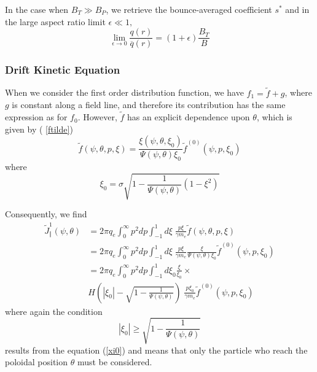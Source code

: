 In the case when $B_{T}\gg B_{P}$, we retrieve the bounce-averaged
coefficient $s^{*}$ and in the large aspect ratio limit $\epsilon\ll1,$%
\begin{equation}
\lim_{\epsilon\rightarrow0}\frac{q\left( r\right) }{\overline{q}\left(
r\right) }=\left( 1+\epsilon\right) \frac{B_{T}}{B}
\end{equation}

\subsubsection{Drift Kinetic Equation}

When we consider the first order distribution function, we have $f_{1}=%
\widetilde{f}+g$, where $g$ is constant along a field line, and therefore
its contribution has the same expression as for $f_{0}$. However, $%
\widetilde{f}$ has an explicit dependence upon $\theta$, which is given by (%
\ref{ftilde})
\begin{equation}
\widetilde{f}(\psi,\theta,p,\xi)=\frac{\xi(\psi,\theta,\xi_{0})}{\Psi
(\psi,\theta)\xi_{0}}\widetilde{f}^{(0)}(\psi,p,\xi_{0})  \label{ftilde2}
\end{equation}
where
\begin{equation}
\xi_{0}=\sigma\sqrt{1-\frac{1}{\Psi\left( \psi,\theta\right) }\left(
1-\xi^{2}\right) }
\end{equation}

Consequently, we find
\begin{align}
\widetilde{J}_{\Vert}^{1}\left( \psi,\theta\right) & =2\pi q_{e}\int
_{0}^{\infty}p^{2}dp\int_{-1}^{1}d\xi\;\frac{p\xi}{\gamma m_{e}}\widetilde
{f}\left( \psi,\theta,p,\xi\right)  \nonumber \\
& =2\pi q_{e}\int_{0}^{\infty}p^{2}dp\int_{-1}^{1}d\xi\;\frac{p\xi}{\gamma
m_{e}}\frac{\xi}{\Psi(\psi,\theta)\xi_{0}}\widetilde{f} ^{(0)}(\psi,p,\xi
_{0})  \nonumber \\
& =2\pi q_{e}\int_{0}^{\infty}p^{2}dp\int_{-1}^{1}d\xi_{0}\frac{\xi}{\xi_{0}}
\times  \nonumber \\
& H\left( \left| \xi_{0}\right| -\sqrt{1-\frac{1}{\Psi\left( \psi
,\theta\right) }}\right) \;\frac{p\xi_{0}}{\gamma m_{e}}\widetilde{f}
^{(0)}\left( \psi,p,\xi_{0}\right)  \label{jpar2}
\end{align}
where again the condition
\begin{equation}
\left| \xi_{0}\right| \geq\sqrt{1-\frac{1}{\Psi\left( \psi,\theta\right) }}
\label{xi0cond1}
\end{equation}
results from the equation (\ref{xi0}) and means that only the particle who
reach the poloidal position $\theta$ must be considered.

